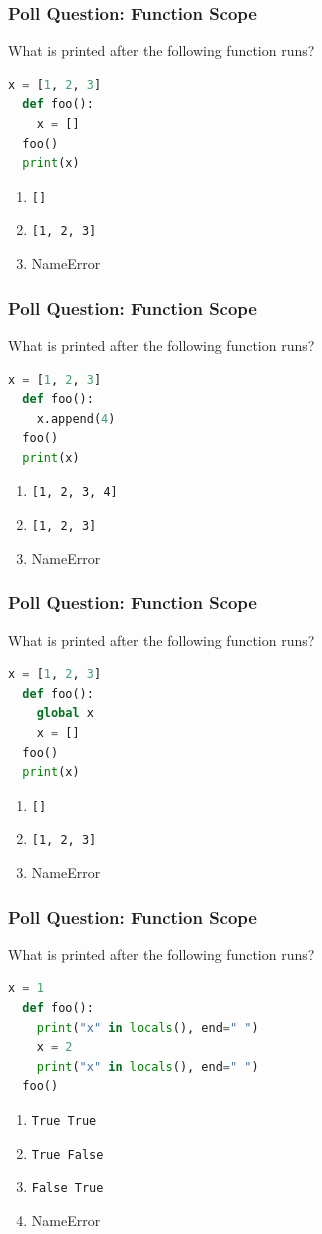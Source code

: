 \documentclass{beamer}
\begin{document}
%
%
\begin{frame}[fragile]
  \frametitle{Poll Question: Function Scope}
  What is printed after the following function runs?
  \begin{lstlisting}[language=Python, autogobble]
  x = [1, 2, 3]
  def foo():
    x = []
  foo()
  print(x)
  \end{lstlisting}
  \vfill
  \begin{enumerate}[A]
    \item \lstinline|[]|
    \item \lstinline|[1, 2, 3]|
    \item NameError
  \end{enumerate}
\end{frame}

%
%
\begin{frame}[fragile]
  \frametitle{Poll Question: Function Scope}
  What is printed after the following function runs?
  \begin{lstlisting}[language=Python, autogobble]
  x = [1, 2, 3]
  def foo():
    x.append(4)
  foo()
  print(x)
  \end{lstlisting}
  \vfill
  \begin{enumerate}[A]
    \item \lstinline|[1, 2, 3, 4]|
    \item \lstinline|[1, 2, 3]|
    \item NameError
  \end{enumerate}
\end{frame}

%
%
\begin{frame}[fragile]
  \frametitle{Poll Question: Function Scope}
  What is printed after the following function runs?
  \begin{lstlisting}[language=Python, autogobble]
  x = [1, 2, 3]
  def foo():
    global x
    x = []
  foo()
  print(x)
  \end{lstlisting}
  \vfill
  \begin{enumerate}[A]
    \item \lstinline|[]|
    \item \lstinline|[1, 2, 3]|
    \item NameError
  \end{enumerate}
\end{frame}

%
%
\begin{frame}[fragile]
  \frametitle{Poll Question: Function Scope}
  What is printed after the following function runs?
  \begin{lstlisting}[language=Python, autogobble]
  x = 1
  def foo():
    print("x" in locals(), end=" ")
    x = 2
    print("x" in locals(), end=" ")
  foo()
  \end{lstlisting}
  \vfill
  \begin{enumerate}[A]
    \item \lstinline|True True|
    \item \lstinline|True False|
    \item \lstinline|False True|
    \item NameError
  \end{enumerate}
\end{frame}
\end{document}
